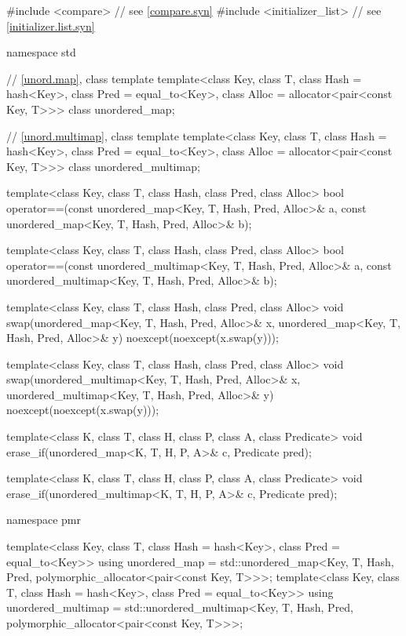 %
%
%
\begin{codeblock}
#include <compare>              // see \ref{compare.syn}
#include <initializer_list>     // see \ref{initializer.list.syn}

namespace std {
  // \ref{unord.map}, class template 
  template<class Key,
           class T,
           class Hash = hash<Key>,
           class Pred = equal_to<Key>,
           class Alloc = allocator<pair<const Key, T>>>
    class unordered_map;

  // \ref{unord.multimap}, class template 
  template<class Key,
           class T,
           class Hash = hash<Key>,
           class Pred = equal_to<Key>,
           class Alloc = allocator<pair<const Key, T>>>
    class unordered_multimap;

  template<class Key, class T, class Hash, class Pred, class Alloc>
    bool operator==(const unordered_map<Key, T, Hash, Pred, Alloc>& a,
                    const unordered_map<Key, T, Hash, Pred, Alloc>& b);

  template<class Key, class T, class Hash, class Pred, class Alloc>
    bool operator==(const unordered_multimap<Key, T, Hash, Pred, Alloc>& a,
                    const unordered_multimap<Key, T, Hash, Pred, Alloc>& b);

  template<class Key, class T, class Hash, class Pred, class Alloc>
    void swap(unordered_map<Key, T, Hash, Pred, Alloc>& x,
              unordered_map<Key, T, Hash, Pred, Alloc>& y)
      noexcept(noexcept(x.swap(y)));

  template<class Key, class T, class Hash, class Pred, class Alloc>
    void swap(unordered_multimap<Key, T, Hash, Pred, Alloc>& x,
              unordered_multimap<Key, T, Hash, Pred, Alloc>& y)
      noexcept(noexcept(x.swap(y)));

  template<class K, class T, class H, class P, class A, class Predicate>
    void erase_if(unordered_map<K, T, H, P, A>& c, Predicate pred);

  template<class K, class T, class H, class P, class A, class Predicate>
    void erase_if(unordered_multimap<K, T, H, P, A>& c, Predicate pred);

  namespace pmr {
    template<class Key,
             class T,
             class Hash = hash<Key>,
             class Pred = equal_to<Key>>
      using unordered_map =
        std::unordered_map<Key, T, Hash, Pred,
                           polymorphic_allocator<pair<const Key, T>>>;
    template<class Key,
             class T,
             class Hash = hash<Key>,
             class Pred = equal_to<Key>>
      using unordered_multimap =
        std::unordered_multimap<Key, T, Hash, Pred,
                                polymorphic_allocator<pair<const Key, T>>>;

  }
}
\end{codeblock}

